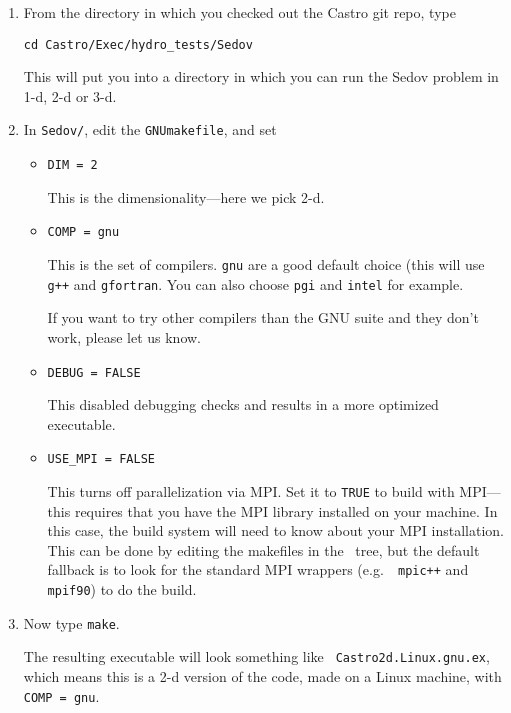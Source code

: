 \begin{enumerate}

\item From the directory in which you checked out the Castro git repo,
  type
\begin{verbatim}
cd Castro/Exec/hydro_tests/Sedov
\end{verbatim}
This will put you into a directory in which you can run the Sedov
problem in 1-d, 2-d or 3-d.

\item In {\tt Sedov/}, edit the {\tt GNUmakefile}, and set
  \begin{itemize}
    \item {\tt DIM = 2} 

      This is the dimensionality---here we pick 2-d.

    \item {\tt COMP = gnu}

      This is the set of compilers.  {\tt gnu} are a good default
      choice (this will use {\tt g++} and {\tt gfortran}.  You can
      also choose {\tt pgi} and {\tt intel} for example.

      If you want to try other compilers than the GNU suite and they
      don't work, please let us know.

    \item {\tt DEBUG = FALSE}

      This disabled debugging checks and results in a more
      optimized executable.

    \item {\tt USE\_MPI = FALSE}

      This turns off parallelization via MPI.  Set it to {\tt TRUE} to
      build with MPI---this requires that you have the MPI library
      installed on your machine.  In this case, the build system will
      need to know about your MPI installation.  This can be done by
      editing the makefiles in the \amrex\ tree, but the default
      fallback is to look for the standard MPI wrappers (e.g.\ {\tt
        mpic++} and {\tt mpif90}) to do the build.

  \end{itemize}

\item Now type {\tt make}.

  The resulting executable will look something like {\tt
    Castro2d.Linux.gnu.ex}, which means this is a 2-d version
  of the code, made on a Linux machine, with {\tt COMP = gnu}.

\end{enumerate}

